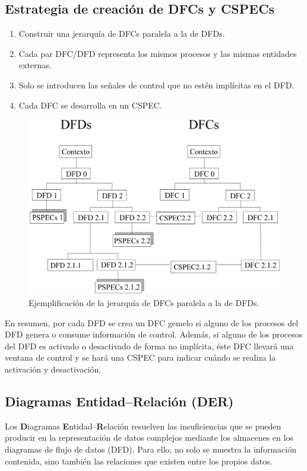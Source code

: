 \subsection{Estrategia de creación de DFCs y CSPECs}

\begin{enumerate}
    \item Construir una jerarquía de DFCs paralela a la de DFDs.
    \item Cada par DFC/DFD representa los mismos procesos y las mismas entidades externas.
    \item Solo se introducen las señales de control que no estén implícitas en el DFD.
    \item Cada DFC se desarrolla en un CSPEC.
\end{enumerate}

\begin{figure}[H]
    \centering
    \includegraphics[width=0.8\linewidth]{Resources/Tema5/jerarquiaDFCs.png}
    \caption{Ejemplificación de la jerarquía de DFCs paralela a la de DFDs.}
\end{figure}

En resumen, por cada DFD se crea un DFC gemelo si alguno de los procesos del DFD genera o consume información de control. Además, si alguno de los procesos del DFD es activado o desactivado de forma no implícita, éste DFC llevará una ventana de control y se hará una CSPEC para indicar cuándo se realiza la activación y desactivación.

\subsection{Diagramas Entidad--Relación (DER)}

Los \textbf{D}iagramas \textbf{E}ntidad--\textbf{R}elación resuelven las insuficiencias que se pueden producir en la representación de datos complejos mediante los almacenes en los diagramas de flujo de datos (DFD). Para ello, no solo se muestra la información contenida, sino también las relaciones que existen entre los propios datos.

